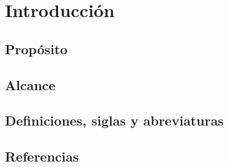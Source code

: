\chapter{Introducción}

\section{Propósito}

\section{Alcance}

\section{Definiciones, siglas y abreviaturas}

\section{Referencias}